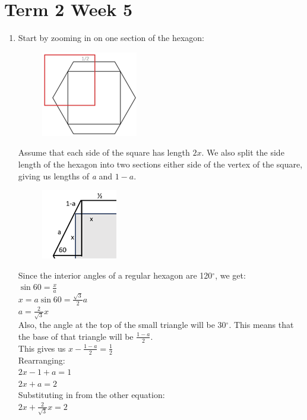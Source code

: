 \documentclass[../main.tex]{subfiles}
\begin{document}
\section*{Term 2 Week 5}
\begin{enumerate}
    \item 
    Start by zooming in on one section of the hexagon:
    \begin{figure}[H]
        \centering
        \includegraphics[width=0.25\linewidth]{images/t2w5q1_a1.png}
    \end{figure}
    Assume that each side of the square has length \(2x\). We also split the side length of the hexagon into two sections either side of the vertex of the square, giving us lengths of \textit{a} and \(1-a\).
    \begin{figure}[H]
        \centering
        \includegraphics[width=0.25\linewidth]{images/t2w5q1_a2.png}
    \end{figure}
    Since the interior angles of a regular hexagon are 120\(^{\circ}\), we get:\\
    \(\sin{60}=\frac{x}{a}\)\\
    \(x=a \sin{60}=\frac{\sqrt{3}}{2}a\)\\
    \(a=\frac{2}{\sqrt{3}}x\)\\

    Also, the angle at the top of the small triangle will be 30\(^{\circ}\). This means that the base of that triangle will be \(\frac{1-a}{2}\).\\
    This gives us \(x-\frac{1-a}{2}=\frac{1}{2}\)\\
    Rearranging:\\
    \(2x-1+a=1\)\\
    \(2x+a=2\)\\

    Substituting in from the other equation:\\
    \(2x+\frac{2}{\sqrt{3}}x=2\)\\


\end{enumerate}
\end{document}

